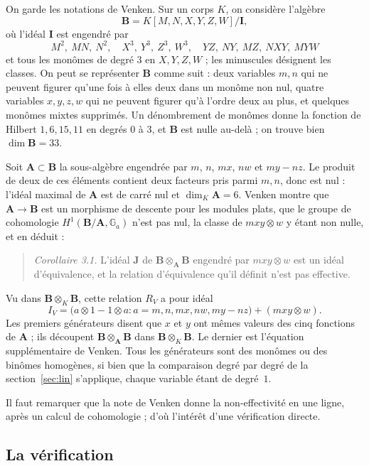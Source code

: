 \documentclass[11pt,a4paper]{amsart}
\theoremstyle{definition}
\theoremstyle{plain}
\theoremstyle{remark}
\begin{document}
On garde les notations de Venken. Sur un corps $K$, on considère l'algèbre
\[
\mathbf B = K[M, N, X, Y, Z, W]/\mathbf I,
\]
où l'idéal $\mathbf I$ est engendré par
\[
M^2,\ MN,\ N^2,\quad X^3,\ Y^3,\ Z^3,\ W^3,\quad YZ,\ NY,\ MZ,\ NXY,\ MYW
\]
et tous les monômes de degré $3$ en $X, Y, Z, W$ ; les minuscules désignent les classes. On peut se représenter $\mathbf B$ comme suit : deux variables $m, n$ qui ne peuvent figurer qu'une fois à elles deux dans un monôme non nul, quatre variables $x, y, z, w$ qui ne peuvent figurer qu'à l'ordre deux au plus, et quelques monômes mixtes supprimés. Un dénombrement de monômes donne la fonction de Hilbert $1, 6, 15, 11$ en degrés $0$ à $3$, et $\mathbf B$ est nulle au-delà ; on trouve bien $\dim \mathbf B = 33$.

Soit $\mathbf A \subset \mathbf B$ la sous-algèbre engendrée par $m$, $n$, $mx$, $nw$ et $my - nz$. Le produit de deux de ces éléments contient deux facteurs pris parmi $m, n$, donc est nul : l'idéal maximal de $\mathbf A$ est de carré nul et $\dim_K \mathbf A = 6$. Venken montre que $\mathbf A \to \mathbf B$ est un morphisme de descente pour les modules plats, que le groupe de cohomologie $H^1(\mathbf B/\mathbf A, \mathbb G_a)$ n'est pas nul, la classe de $mxy \otimes w$ y étant non nulle, et en déduit :

\begin{quote}
\emph{Corollaire 3.1.} L'idéal $\mathbf J$ de $\mathbf B \otimes_{\mathbf A} \mathbf B$ engendré par $mxy \otimes w$ est un idéal d'équivalence, et la relation d'équivalence qu'il définit n'est pas effective.
\end{quote}

Vu dans $\mathbf B \otimes_K \mathbf B$, cette relation $R_V$ a pour idéal
\[
I_V = \bigl(a \otimes 1 - 1 \otimes a : a = m, n, mx, nw, my - nz\bigr) + (mxy \otimes w).
\]
Les premiers générateurs disent que $x$ et $y$ ont mêmes valeurs des cinq fonctions de $\mathbf A$ ; ils découpent $\mathbf B \otimes_{\mathbf A} \mathbf B$ dans $\mathbf B \otimes_K \mathbf B$. Le dernier est l'équation supplémentaire de Venken. Tous les générateurs sont des monômes ou des binômes homogènes, si bien que la comparaison degré par degré de la section~\ref{sec:lin} s'applique, chaque variable étant de degré~$1$.

Il faut remarquer que la note de Venken donne la non-effectivité en une ligne, après un calcul de cohomologie ; d'où l'intérêt d'une vérification directe.

\subsection{La vérification}
\end{document}
